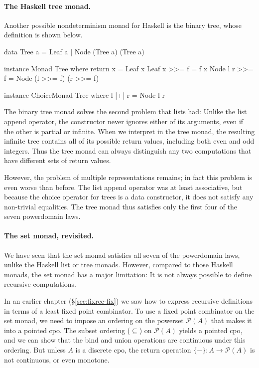 \paragraph{The Haskell tree monad.} Another possible nondeterminism monad for Haskell is the binary tree, whose definition is shown below.
\begin{hscode}
data Tree a = Leaf a | Node (Tree a) (Tree a)
\end{hscode}
\begin{hscode}
instance Monad Tree where
  return x       = Leaf x
  Leaf x   >>= f = f x
  Node l r >>= f = Node (l >>= f) (r >>= f)
\end{hscode}
\begin{hscode}
instance ChoiceMonad Tree where
  l |+| r = Node l r
\end{hscode}
The binary tree monad solves the second problem that lists had: Unlike the list append operator, the  constructor never ignores either of its arguments, even if the other is partial or infinite. When we interpret  in the tree monad, the resulting infinite tree contains all of its possible return values, including both even and odd integers. Thus the tree monad can always distinguish any two computations that have different sets of return values.

However, the problem of multiple representations remains; in fact this problem is even worse than before. The list append operator was at least associative, but because the choice operator for trees is a data constructor, it does not satisfy any non-trivial equalities. The tree monad thus satisfies only the first four of the seven powerdomain laws.

\paragraph{The set monad, revisited.} We have seen that the set monad satisfies all seven of the powerdomain laws, unlike the Haskell list or tree monads. However, compared to those Haskell monads, the set monad has a major limitation: It is not always possible to define recursive computations.

In an earlier chapter (\S\ref{sec:fixrec-fix}) we saw how to express recursive definitions in terms of a least fixed point combinator. To use a fixed point combinator on the set monad, we need to impose an ordering on the powerset $\mathcal{P}(A)$ that makes it into a pointed cpo. The subset ordering ($\subseteq$) on $\mathcal{P}(A)$ yields a pointed cpo, and we can show that the bind and union operations are continuous under this ordering. But unless $A$ is a discrete cpo, the return operation $\{-\} : A \to \mathcal{P}(A)$ is not continuous, or even monotone.

